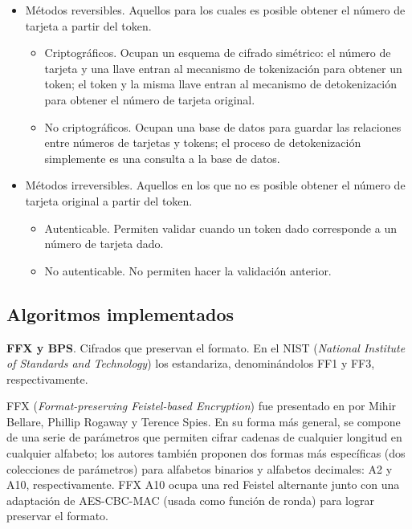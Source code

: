 \begin{itemize}
  \item Métodos reversibles. Aquellos para los cuales es posible obtener el
    número de tarjeta a partir del token.
    \begin{itemize}
      \item Criptográficos. Ocupan un esquema de cifrado simétrico: el número
        de tarjeta y una llave entran al mecanismo de tokenización para obtener
        un token; el token y la misma llave entran al mecanismo de
        detokenización para obtener el número de tarjeta original.
      \item No criptográficos. Ocupan una base de datos para guardar las
        relaciones entre números de tarjetas y tokens; el proceso de
        detokenización simplemente es una consulta a la base de datos.
    \end{itemize}
  \item Métodos irreversibles. Aquellos en los que no es posible obtener el
    número de tarjeta original a partir del token.
    \begin{itemize}
      \item Autenticable. Permiten validar cuando un token dado corresponde a
        un número de tarjeta dado.
      \item No autenticable. No permiten hacer la validación anterior.
    \end{itemize}
\end{itemize}

\subsection{Algoritmos implementados}
\label{sec:implementaciones}

\textbf{FFX y BPS}. Cifrados que preservan el formato. En \cite{nist_fpe} el NIST (\textit{National Institute of Standards and Technology}) los estandariza, denominándolos FF1 y FF3, respectivamente.


FFX (\textit{Format-preserving Feistel-based Encryption}) fue presentado en
\cite{ffx_1} por Mihir Bellare, Phillip Rogaway y Terence Spies. En su forma más
general, se compone de una serie de parámetros que permiten cifrar cadenas de
cualquier longitud en cualquier alfabeto; los autores también proponen dos
formas más específicas (dos colecciones de parámetros) para alfabetos binarios y
alfabetos decimales: A2 y A10, respectivamente. FFX A10 ocupa una red Feistel
alternante junto con una adaptación de AES-CBC-MAC (usada como función de ronda)
para lograr preservar el formato.

